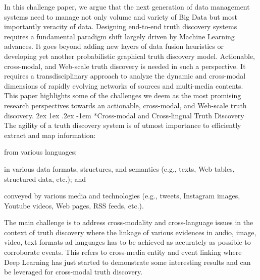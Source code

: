 \documentclass[prodmode,acmtecs]{acmsmall} %
\makeatletter
\renewcommand\paragraph{\@startsection{paragraph}{5}{\z@}%
                                       {2ex \@plus1ex \@minus .2ex}%
                                       {-1em}%
                                      {\sffamily\normalsize\bfseries}}
\makeatother
\begin{document}
 In this challenge paper, we argue that the next generation of data management systems need to 
 manage not only volume and variety of Big Data but most importantly veracity of data. Designing
 end-to-end truth discovery systems requires a fundamental paradigm shift largely driven by Machine Learning advances.
 It goes beyond adding new layers of data fusion heuristics or developing yet another probabilistic graphical truth discovery model. 
 Actionable, cross-modal, and Web-scale truth discovery is needed in such a perspective. It requires a transdisciplinary approach to
 analyze the dynamic and cross-modal dimensions of rapidly evolving networks of sources and multi-media contents. 
This paper highlights some of the challenges we deem as the most promising research perspectives towards an actionable, cross-modal, 
and Web-scale truth discovery.
%
\vspace*{-0.23cm}
\paragraph*{Cross-modal and Cross-lingual Truth Discovery} 
The agility of a truth discovery system is of utmost importance to efficiently extract and map information: 
\begin{inparaenum}[(i)]
\item from various languages;
\item in various data formats, structures, and semantics (e.g., texts, Web tables, structured data, etc.); and
\item  conveyed by various media and technologies (e.g., tweets, Instagram images, Youtube videos, Web pages, RSS feeds, etc.).
\end{inparaenum}
The main challenge is to address cross-modality and cross-language issues in the context of truth discovery where the linkage of various 
evidences in audio, image, video, text formats ad languages has to be achieved as accurately as possible to corroborate events. This refers
to cross-media entity and event linking where Deep Learning has just started to demonstrate some interesting results and can be leveraged for
cross-modal truth discovery.
\vspace*{-0.23cm}
\end{document}
